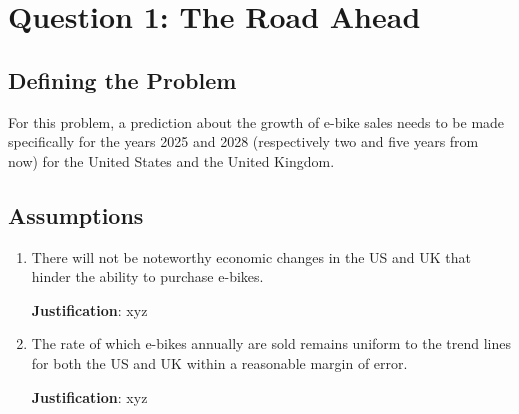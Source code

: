 \section{Question 1: The Road Ahead}
\subsection{Defining the Problem}
    For this problem, a prediction about the growth of e-bike sales needs to be made specifically for the years 2025 and 2028 (respectively two and five years from now) for the United States and the United Kingdom.
\subsection{Assumptions}
    \begin{enumerate}
        \item There will not be noteworthy economic changes in the US and UK that hinder the ability to purchase e-bikes.

        \textbf{Justification}: xyz
        \item The rate of which e-bikes annually are sold remains uniform to the trend lines for both the US and UK within a reasonable margin of error.

        \textbf{Justification}: xyz
    \end{enumerate}
